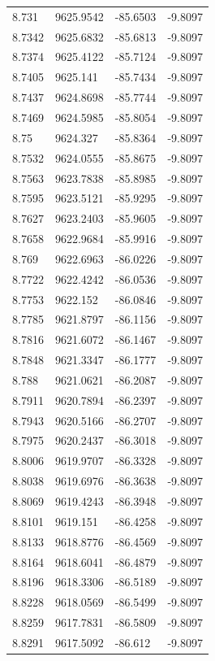 \begin{table}[H]
\begin{tabular}{llll}
8.731 & 9625.9542 & -85.6503 & -9.8097 \\
8.7342 & 9625.6832 & -85.6813 & -9.8097 \\
8.7374 & 9625.4122 & -85.7124 & -9.8097 \\
8.7405 & 9625.141 & -85.7434 & -9.8097 \\
8.7437 & 9624.8698 & -85.7744 & -9.8097 \\
8.7469 & 9624.5985 & -85.8054 & -9.8097 \\
8.75 & 9624.327 & -85.8364 & -9.8097 \\
8.7532 & 9624.0555 & -85.8675 & -9.8097 \\
8.7563 & 9623.7838 & -85.8985 & -9.8097 \\
8.7595 & 9623.5121 & -85.9295 & -9.8097 \\
8.7627 & 9623.2403 & -85.9605 & -9.8097 \\
8.7658 & 9622.9684 & -85.9916 & -9.8097 \\
8.769 & 9622.6963 & -86.0226 & -9.8097 \\
8.7722 & 9622.4242 & -86.0536 & -9.8097 \\
8.7753 & 9622.152 & -86.0846 & -9.8097 \\
8.7785 & 9621.8797 & -86.1156 & -9.8097 \\
8.7816 & 9621.6072 & -86.1467 & -9.8097 \\
8.7848 & 9621.3347 & -86.1777 & -9.8097 \\
8.788 & 9621.0621 & -86.2087 & -9.8097 \\
8.7911 & 9620.7894 & -86.2397 & -9.8097 \\
8.7943 & 9620.5166 & -86.2707 & -9.8097 \\
8.7975 & 9620.2437 & -86.3018 & -9.8097 \\
8.8006 & 9619.9707 & -86.3328 & -9.8097 \\
8.8038 & 9619.6976 & -86.3638 & -9.8097 \\
8.8069 & 9619.4243 & -86.3948 & -9.8097 \\
8.8101 & 9619.151 & -86.4258 & -9.8097 \\
8.8133 & 9618.8776 & -86.4569 & -9.8097 \\
8.8164 & 9618.6041 & -86.4879 & -9.8097 \\
8.8196 & 9618.3306 & -86.5189 & -9.8097 \\
8.8228 & 9618.0569 & -86.5499 & -9.8097 \\
8.8259 & 9617.7831 & -86.5809 & -9.8097 \\
8.8291 & 9617.5092 & -86.612 & -9.8097 \\

\end{tabular}
\end{table}
